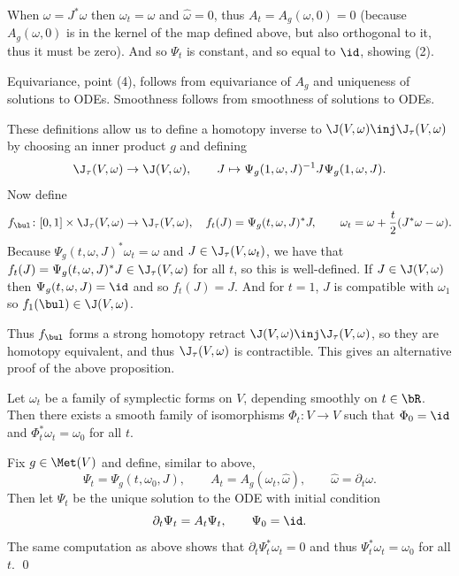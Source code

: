When $\omega=J^*\omega$ then $\omega_t=\omega$ and $\hat\omega=0$, thus $A_t=A_g(\omega,0)=0$ (because $A_g(\omega,0)$ is in the kernel of the map defined above,
but also orthogonal to it, thus it must be zero).
And so $\Psi_t$ is constant, and so equal to $\id$, showing (2).

Equivariance, point (4), follows from equivariance of $A_g$ and uniqueness of solutions to ODEs.
Smoothness follows from smoothness of solutions to ODEs.

These definitions allow us to define a homotopy inverse to $\J(V,\omega)\inj\J_\tau(V,\omega)$ by choosing an inner product $g$ and defining
$$ \J_\tau(V,\omega) \to \J(V,\omega),\qquad J\mapsto \Psi_g(1,\omega,J)^{-1}J\Psi_g(1,\omega,J) . $$
Now define
$$ f_\bul\colon[0,1]\times\J_\tau(V,\omega) \to \J_\tau(V,\omega),\quad f_t(J) = \Psi_g(t,\omega,J)^*J,\qquad \omega_t = \omega + \frac t2(J^*\omega-\omega) . $$
Because $\Psi_g(t,\omega,J)^*\omega_t=\omega$ and $J\in\J_\tau(V,\omega_t)$, we have that $f_t(J)=\Psi_g(t,\omega,J)^*J\in\J_\tau(V,\omega)$ for all $t$, so this is well-defined.
If $J\in\J(V,\omega)$ then $\Psi_g(t,\omega,J)=\id$ and so $f_t(J)=J$.
And for $t=1$, $J$ is compatible with $\omega_1$ so $f_1(\bul)\in\J(V,\omega)$.

Thus $f_\bul$ forms a strong homotopy retract $\J(V,\omega)\inj\J_\tau(V,\omega)$, so they are homotopy equivalent, and thus $\J_\tau(V,\omega)$ is contractible.
This gives an alternative proof of the above proposition.

\bprop[name={sympfamfromiso}]

    Let $\omega_t$ be a family of symplectic forms on $V$, depending smoothly on $t\in\bR$.
    Then there exists a smooth family of isomorphisms $\Phi_t\colon V\to V$ such that $\Phi_0=\id$ and $\Phi_t^*\omega_t=\omega_0$ for all $t$.

\eprop

\bproof

    Fix $g\in\Met(V)$ and define, similar to above,
    $$ \Psi_t = \Psi_g(t,\omega_0,J),\qquad A_t = A_g(\omega_t,\hat\omega),\qquad \hat\omega = \partial_t\omega . $$
    Then let $\Psi_t$ be the unique solution to the ODE with initial condition
    $$ \partial_t\Psi_t = A_t\Psi_t,\qquad \Psi_0 = \id . $$
    The same computation as above shows that $\partial_t\Psi_t^*\omega_t=0$ and thus $\Psi_t^*\omega_t=\omega_0$ for all $t$.
    \qed

\eproof


